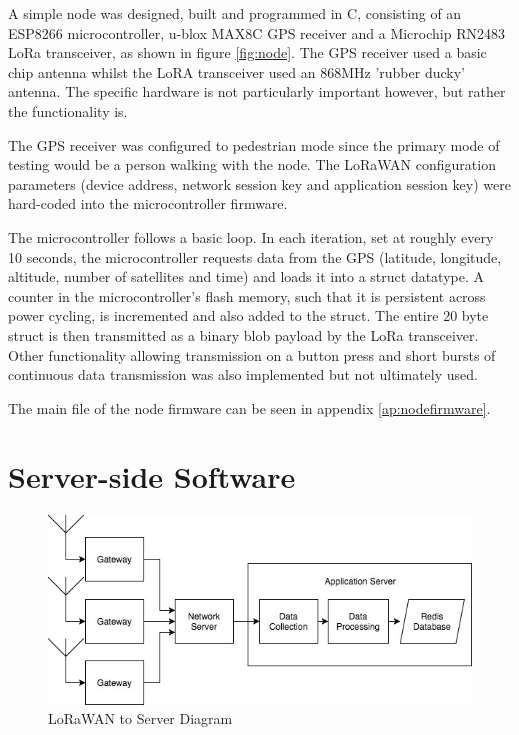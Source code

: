 \documentclass[a4paper]{report}
\begin{document}
    A simple node was designed, built and programmed in C, consisting of an ESP8266 microcontroller, u-blox MAX8C GPS receiver and a Microchip RN2483 LoRa transceiver, as shown in figure \ref{fig:node}. The GPS receiver used a basic chip antenna whilst the LoRA transceiver used an 868MHz 'rubber ducky' antenna. The specific hardware is not particularly important however, but rather the functionality is.

    The GPS receiver was configured to pedestrian mode since the primary mode of testing would be a person walking with the node. The LoRaWAN configuration parameters (device address, network session key and application session key) were hard-coded into the microcontroller firmware.

    The microcontroller follows a basic loop. In each iteration, set at roughly every 10 seconds, the microcontroller requests data from the GPS (latitude, longitude, altitude, number of satellites and time) and loads it into a struct datatype. A counter in the microcontroller's flash memory, such that it is persistent across power cycling, is incremented and also added to the struct. The entire 20 byte struct is then transmitted as a binary blob payload by the LoRa transceiver. Other functionality allowing transmission on a button press and short bursts of continuous data transmission was also implemented but not ultimately used.

    The main file of the node firmware can be seen in appendix \ref{ap:nodefirmware}.


  \section{Server-side Software}

    \begin{figure}
    \centering
    \includegraphics[width=12cm]{figures/server.jpeg}
    \caption{LoRaWAN to Server Diagram}
    \label{fig:server}
    \end{figure}
\end{document}
